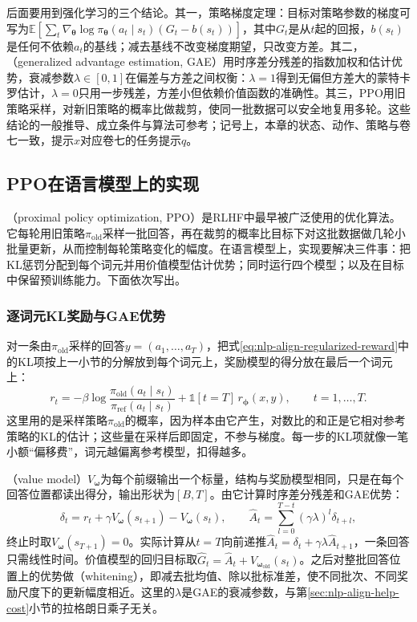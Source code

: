 后面要用到强化学习的三个结论。其一，策略梯度定理：目标对策略参数的梯度可写为$\mathbb E[\sum_t\nabla_{\bm\theta}\log\pi_{\bm\theta}(a_t\mid s_t)(G_t-b(s_t))]$，其中$G_t$是从$t$起的回报，$b(s_t)$是任何不依赖$a_t$的基线；减去基线不改变梯度期望，只改变方差。其二，（generalized advantage estimation, GAE）用时序差分残差的指数加权和估计优势，衰减参数$\lambda\in[0,1]$在偏差与方差之间权衡：$\lambda=1$得到无偏但方差大的蒙特卡罗估计，$\lambda=0$只用一步残差，方差小但依赖价值函数的准确性。其三，PPO用旧策略采样，对新旧策略的概率比做裁剪，使同一批数据可以安全地复用多轮。这些结论的一般推导、成立条件与算法可参考；记号上，本章的状态、动作、策略与卷七一致，提示$x$对应卷七的任务提示$q$。

\subsection{PPO在语言模型上的实现}
\label{sec:nlp-align-ppo}

（proximal policy optimization, PPO）是RLHF中最早被广泛使用的优化算法。它每轮用旧策略$\pi_{\mathrm{old}}$采样一批回答，再在裁剪的概率比目标下对这批数据做几轮小批量更新，从而控制每轮策略变化的幅度。在语言模型上，实现要解决三件事：把KL惩罚分配到每个词元并用价值模型估计优势；同时运行四个模型；以及在目标中保留预训练能力。下面依次写出。

\subsubsection{逐词元KL奖励与GAE优势}
\label{sec:nlp-align-ppo-gae}

对一条由$\pi_{\mathrm{old}}$采样的回答$y=(a_1,\ldots,a_T)$，把式\eqref{eq:nlp-align-regularized-reward}中的KL项按上一小节的分解放到每个词元上，奖励模型的得分放在最后一个词元上：
\begin{equation}
\label{eq:nlp-align-token-reward}
 r_t=-\beta\log\frac{\pi_{\mathrm{old}}(a_t\mid s_t)}{\pi_{\mathrm{ref}}(a_t\mid s_t)}
 +\mathbb 1[t=T]\,r_{\bm\phi}(x,y),\qquad t=1,\ldots,T.
\end{equation}
这里用的是采样策略$\pi_{\mathrm{old}}$的概率，因为样本由它产生，对数比的和正是它相对参考策略的KL的估计；这些量在采样后即固定，不参与梯度。每一步的KL项就像一笔小额“偏移费”，词元越偏离参考模型，扣得越多。

（value model）$V_{\bm\omega}$为每个前缀输出一个标量，结构与奖励模型相同，只是在每个回答位置都读出得分，输出形状为$[B,T]$。由它计算时序差分残差和GAE优势：
\begin{equation}
\label{eq:nlp-align-gae}
 \delta_t=r_t+\gamma V_{\bm\omega}(s_{t+1})-V_{\bm\omega}(s_t),\qquad
 \widehat A_t=\sum_{l=0}^{T-t}(\gamma\lambda)^l\delta_{t+l},
\end{equation}
终止时取$V_{\bm\omega}(s_{T+1})=0$。实际计算从$t=T$向前递推$\widehat A_t=\delta_t+\gamma\lambda\widehat A_{t+1}$，一条回答只需线性时间。价值模型的回归目标取$\widehat G_t=\widehat A_t+V_{\bm\omega_{\mathrm{old}}}(s_t)$。之后对整批回答位置上的优势做（whitening），即减去批均值、除以批标准差，使不同批次、不同奖励尺度下的更新幅度相近。这里的$\lambda$是GAE的衰减参数，与第\ref{sec:nlp-align-help-cost}小节的拉格朗日乘子无关。


